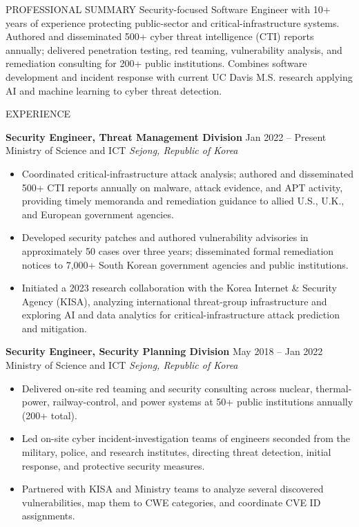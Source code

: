 \documentclass{resume}
\begin{document}
\begin{rSection}{PROFESSIONAL SUMMARY}
Security-focused Software Engineer with 10+ years of experience protecting public-sector and critical-infrastructure systems. Authored and disseminated 500+ cyber threat intelligence (CTI) reports annually; delivered penetration testing, red teaming, vulnerability analysis, and remediation consulting for 200+ public institutions. Combines software development and incident response with current UC Davis M.S. research applying AI and machine learning to cyber threat detection.
\end{rSection}

\begin{rSection}{EXPERIENCE}

\textbf{Security Engineer, Threat Management Division} \hfill Jan 2022 -- Present\\
Ministry of Science and ICT \hfill \textit{Sejong, Republic of Korea}
\begin{itemize}
    \itemsep -4pt {}
    \item Coordinated critical-infrastructure attack analysis; authored and disseminated 500+ CTI reports annually on malware, attack evidence, and APT activity, providing timely memoranda and remediation guidance to allied U.S., U.K., and European government agencies.
    \item Developed security patches and authored vulnerability advisories in approximately 50 cases over three years; disseminated formal remediation notices to 7,000+ South Korean government agencies and public institutions.
    \item Initiated a 2023 research collaboration with the Korea Internet \& Security Agency (KISA), analyzing international threat-group infrastructure and exploring AI and data analytics for critical-infrastructure attack prediction and mitigation.
\end{itemize}

\textbf{Security Engineer, Security Planning Division} \hfill May 2018 -- Jan 2022\\
Ministry of Science and ICT \hfill \textit{Sejong, Republic of Korea}
\begin{itemize}
    \itemsep -4pt {}
    \item Delivered on-site red teaming and security consulting across nuclear, thermal-power, railway-control, and power systems at 50+ public institutions annually (200+ total).
    \item Led on-site cyber incident-investigation teams of engineers seconded from the military, police, and research institutes, directing threat detection, initial response, and protective security measures.
    \item Partnered with KISA and Ministry teams to analyze several discovered vulnerabilities, map them to CWE categories, and coordinate CVE ID assignments.
\end{itemize}


\end{rSection}
\end{document}
